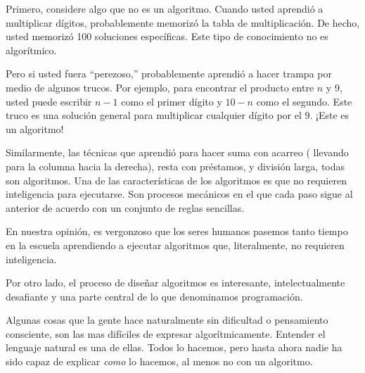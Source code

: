 Primero, considere algo que no es un algoritmo. Cuando usted aprendió
a multiplicar dígitos, probablemente memorizó la tabla de multiplicación.
De hecho, usted memorizó 100 soluciones específicas. Este tipo de
conocimiento no es algorítmico.

Pero si usted fuera ``perezoso,'' probablemente aprendió a hacer
trampa por medio de algunos trucos. Por ejemplo, para encontrar el
producto entre $n$ y 9, usted puede escribir $n-1$ como el primer
dígito y $10-n$ como el segundo. Este truco es una solución general
para multiplicar cualquier dígito por el 9. ¡Este es un algoritmo!

Similarmente, las técnicas que aprendió para hacer suma con acarreo
( llevando para la columna hacia la derecha), resta con préstamos,
y división larga, todas son algoritmos. Una de las características
de los algoritmos es que no requieren inteligencia para ejecutarse.
Son procesos mecánicos en el que cada paso sigue al anterior de acuerdo
con un conjunto de reglas sencillas.

En nuestra opinión, es vergonzoso que los seres humanos pasemos tanto
tiempo en la escuela aprendiendo a ejecutar algoritmos que, literalmente,
no requieren inteligencia.

Por otro lado, el proceso de diseñar algoritmos es interesante, intelectualmente
desafiante y una parte central de lo que denominamos programación.

Algunas cosas que la gente hace naturalmente sin dificultad o pensamiento
consciente, son las mas difíciles de expresar algorítmicamente. Entender
el lenguaje natural es una de ellas. Todos lo hacemos, pero hasta
ahora nadie ha sido capaz de explicar {\em como} lo hacemos, al
menos no con un algoritmo.

